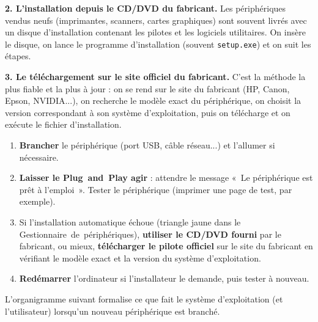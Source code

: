 \documentclass[11pt]{article}
\begin{document}
\textbf{2. L'installation depuis le CD/DVD du fabricant.} Les périphériques vendus neufs (imprimantes, scanners, cartes graphiques) sont souvent livrés avec un disque d'installation contenant les pilotes et les logiciels utilitaires. On insère le disque, on lance le programme d'installation (souvent \texttt{setup.exe}) et on suit les étapes.

\textbf{3. Le téléchargement sur le site officiel du fabricant.} C'est la méthode la plus fiable et la plus à jour : on se rend sur le site du fabricant (HP, Canon, Epson, NVIDIA...), on recherche le modèle exact du périphérique, on choisit la version correspondant à son système d'exploitation, puis on télécharge et on exécute le fichier d'installation.

\begin{methode}
\begin{enumerate}
  \item \textbf{Brancher} le périphérique (port USB, câble réseau...) et l'allumer si nécessaire.
  \item \textbf{Laisser le Plug~and~Play agir} : attendre le message «~Le périphérique est prêt à l'emploi~». Tester le périphérique (imprimer une page de test, par exemple).
  \item Si l'installation automatique échoue (triangle jaune dans le Gestionnaire~de~périphériques), \textbf{utiliser le CD/DVD fourni} par le fabricant, ou mieux, \textbf{télécharger le pilote officiel} sur le site du fabricant en vérifiant le modèle exact et la version du système d'exploitation.
  \item \textbf{Redémarrer} l'ordinateur si l'installateur le demande, puis tester à nouveau.
\end{enumerate}
\end{methode}

L'organigramme suivant formalise ce que fait le système d'exploitation (et l'utilisateur) lorsqu'un nouveau périphérique est branché.
\end{document}
